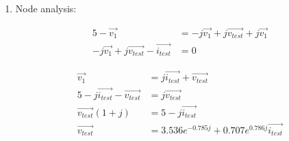 \documentclass[11pt]{article}
\begin{document}
\begin{enumerate}[\alph*)]
\begin{align*}
36 e ^{1.571j} &= \vec{v_o} 0.00002 e ^{1.594j} - 0.0004 \vec{v_o} j e ^{1.594j} + 0.004 \vec{v_o} j ( 0.04 e ^{1.594j} - 1 ) \\
36 e ^{1.571j} &= \vec{v_o} 0.00002 e ^{1.594j} - 0.0004 \vec{v_o} j e ^{1.594j} + 0.004 \vec{v_o} ( - 1.0009 j - 0.040) \\
36 e ^{1.571j} &= \vec{v_o} 0.00002 e ^{1.594j} - 0.0004 \vec{v_o} j e ^{1.594j} - 0.004 \vec{v_o} j - 0.00016 \vec{v_o} \\
\vec{v_o} &= \frac{36 e ^{1.571j}}{0.00002 e ^{1.594j} - 0.0004j e ^{1.594j} - 0.004j - 0.00016} \\
\vec{v_o} &= \frac{36 e ^{1.571j}}{0.00398 e ^{1.511j}} \\
\vec{v_o} &= 9045 e ^{0.06j} \\
v_o (t) &= \boxed{9045 \cos (2000t + 0.06)}
\end{align*}

\item

Node analysis:

\begin{align*}
5 - \vec{v_1} &= - j \vec{v_1} + j \vec{v _{test}} + j \vec{v_1} \\
- j \vec{v_1} + j \vec{v _{test}} - \vec{i _{test}} &= 0
\end{align*}

\begin{align*}
\vec{v_1} &=  j \vec{i _{test}} + \vec{v _{test}} \\
5 - j \vec{i _{test}} - \vec{v _{test}} &= j \vec{ v _{test}} \\
\vec{v _{test}} (1 + j) &= 5 - j \vec{i _{test}} \\
\vec{v _{test}} &= \boxed{3.536 e ^{-0.785j} + 0.707 e ^{0.786j} \vec{i _{test}}}
\end{align*}

\end{enumerate}

\pagebreak
\end{document}
